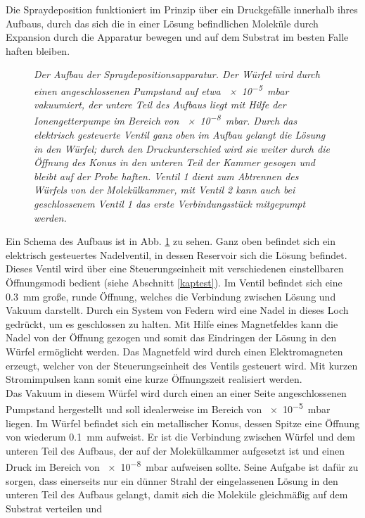  Die Spraydeposition funktioniert im Prinzip über ein Druckgefälle innerhalb ihres
Aufbaus, durch das sich die in einer Lösung befindlichen Moleküle durch Expansion durch die
Apparatur bewegen und auf dem Substrat im besten Falle haften bleiben. 
\\
\begin{figure}
\centering
\sffamily

\caption{\textit{Der Aufbau der Spraydepositionsapparatur.
Der Würfel wird durch einen angeschlossenen Pumpstand auf etwa \SI{e-5}{mbar} vakuumiert, der untere
Teil des Aufbaus liegt mit Hilfe der Ionengetterpumpe im Bereich von \SI{e-8}{mbar}. Durch das
elektrisch gesteuerte Ventil ganz oben im Aufbau gelangt die Lösung in den Würfel; durch den
Druckunterschied wird sie weiter durch die Öffnung des Konus in den unteren Teil der Kammer gesogen
und bleibt auf der Probe haften. Ventil 1 dient zum Abtrennen des Würfels von der Molekülkammer, mit
Ventil 2 kann auch bei geschlossenem Ventil 1 das erste Verbindungsstück mitgepumpt werden.
}}
\label{sbaufbau}
\end{figure}
Ein Schema des Aufbaus ist in Abb. \ref{sbaufbau} zu sehen. Ganz oben befindet sich ein elektrisch
gesteuertes Nadelventil, in dessen Reservoir sich die Lösung befindet. Dieses Ventil wird über eine
Steuerungseinheit mit verschiedenen einstellbaren Öffnungsmodi bedient (siehe Abschnitt \ref{kaptest}). 
Im Ventil befindet sich eine \SI{0,3}{mm} große, runde Öffnung, welches die Verbindung zwischen
Lösung und Vakuum darstellt. Durch ein System von Federn wird eine Nadel in dieses Loch gedrückt, um
es geschlossen zu halten.
Mit Hilfe eines Magnetfeldes kann die Nadel von der Öffnung gezogen und somit das Eindringen der
Lösung in den Würfel ermöglicht werden. 
Das Magnetfeld wird durch einen Elektromagneten erzeugt, welcher von der Steuerungseinheit des
Ventils gesteuert wird. Mit kurzen Stromimpulsen kann somit eine kurze Öffnungszeit realisiert
werden.
\\
Das Vakuum in diesem Würfel wird durch einen an einer Seite angeschlossenen Pumpstand hergestellt
und soll idealerweise im Bereich von \SI{e-5}{mbar} liegen. Im Würfel befindet sich ein metallischer
Konus, dessen Spitze eine Öffnung von wiederum \SI{0,1}{mm} aufweist. Er ist die Verbindung zwischen
Würfel und dem unteren Teil des Aufbaus, der auf der Molekülkammer aufgesetzt ist und einen Druck im Bereich von
\SI{e-8}{mbar} aufweisen sollte.  
Seine Aufgabe ist dafür zu sorgen, dass einerseits nur ein dünner Strahl der eingelassenen Lösung in
den unteren Teil des Aufbaus gelangt, damit sich die Moleküle gleichmäßig auf dem Substrat verteilen und
